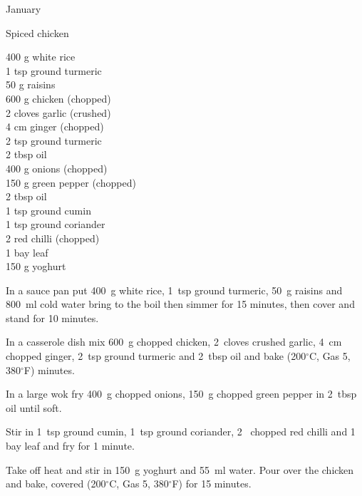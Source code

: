 \begin{menu}{January}
\begin{recipe}{2}{Spiced chicken}
		\begin{ingredients}
		400 g white rice  \\
	1 tsp ground turmeric  \\
	50 g raisins  \\
	600 g chicken (chopped) \\
	2 cloves garlic (crushed) \\
	4 cm ginger (chopped) \\
	2 tsp ground turmeric  \\
	2 tbsp oil  \\
	400 g onions (chopped) \\
	150 g green pepper (chopped) \\
	2 tbsp oil  \\
	1 tsp ground cumin  \\
	1 tsp ground coriander  \\
	2  red chilli (chopped) \\
	1  bay leaf  \\
	150 g yoghurt  \\
	
		\end{ingredients}
	
    \begin{instructions}
    \item 
      In a
      sauce pan
      put
      400~g  white rice,
      1~tsp  ground turmeric,
      50~g  raisins
      and
      800~ml  cold water
      bring to the boil then simmer for 15 minutes,
      then cover and stand for 10 minutes.
    \item 
        In a casserole dish mix
        600~g chopped chicken,
        2~cloves crushed garlic,
        4~cm chopped ginger,
        2~tsp  ground turmeric and
        2~tbsp  oil
        and
        bake 
      (200$^{\circ}$C, Gas 5, 380$^{\circ}$F)
     minutes.
      \item 
        In a large wok fry
        400~g chopped onions,
        150~g chopped green pepper
        in
        2~tbsp  oil
        until soft.
      \item 
        Stir in
        1~tsp  ground cumin,
        1~tsp  ground coriander,
        2~ chopped red chilli
        and
        1~  bay leaf
        and fry for 1 minute.
      \item 
        Take off heat
        and
        stir in
        150~g  yoghurt
        and
        55~ml  water.
        Pour over the chicken
        and bake,
        covered 
      (200$^{\circ}$C, Gas 5, 380$^{\circ}$F)
     for 15 minutes.
      

\end{instructions}
\end{recipe}
\end{menu}
